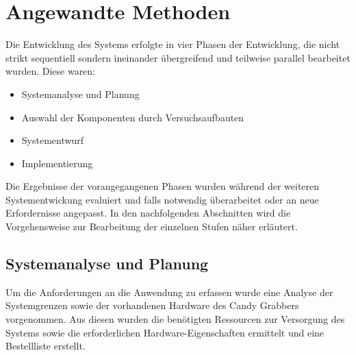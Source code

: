 \documentclass[BMR,Bachelor,ngerman]{twbook}%
\begin{document}
%
\clearpage
\chapter{Angewandte Methoden}
Die Entwicklung des Systems erfolgte in vier Phasen der Entwicklung, die nicht strikt sequentiell sondern ineinander übergreifend und teilweise parallel bearbeitet wurden. Diese waren:
\begin{itemize}
	\item{Systemanalyse und Planung}
	\item{Auswahl der Komponenten durch Versuchsaufbauten}
	\item{Systementwurf}
	\item{Implementierung}
\end{itemize}
Die Ergebnisse der vorangegangenen Phasen wurden während der weiteren Systementwickung evaluiert und falls notwendig überarbeitet oder an neue Erfordernisse angepasst. In den nachfolgenden Abschnitten wird die Vorgehensweise zur Bearbeitung der einzelnen Stufen näher erläutert.
%
\section{Systemanalyse und Planung}
Um die Anforderungen an die Anwendung zu erfassen wurde eine Analyse der Systemgrenzen sowie der vorhandenen Hardware des Candy Grabbers vorgenommen. Aus diesen wurden die benötigten Ressourcen zur Versorgung des Systems sowie die erforderlichen Hardware-Eigenschaften ermittelt und eine Bestellliste erstellt. %

\end{document}
